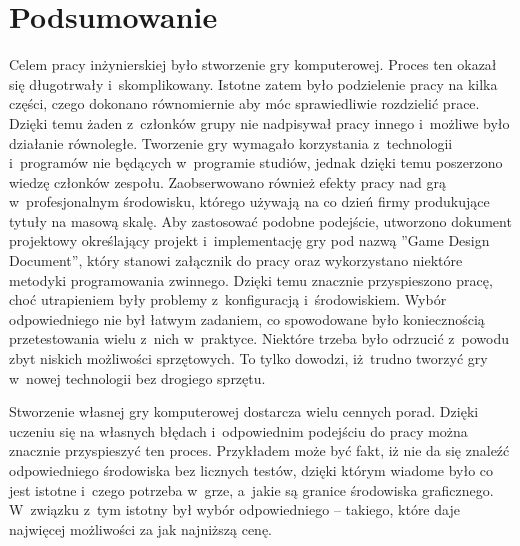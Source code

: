 \chapter{Podsumowanie}

Celem pracy inżynierskiej było stworzenie gry komputerowej. Proces ten okazał się długotrwały i~skomplikowany. Istotne zatem było podzielenie pracy na kilka części, czego dokonano równomiernie aby móc sprawiedliwie rozdzielić prace. Dzięki temu żaden z~członków grupy nie nadpisywał pracy innego i~możliwe było działanie równoległe. Tworzenie gry wymagało korzystania z~technologii i~programów nie będących w~programie studiów, jednak dzięki temu poszerzono wiedzę członków zespołu. Zaobserwowano również efekty pracy nad grą w~profesjonalnym środowisku, którego używają na co dzień firmy produkujące tytuły na masową skalę. Aby zastosować podobne podejście, utworzono dokument projektowy określający projekt i~implementację gry pod nazwą ''Game Design Document'', który stanowi załącznik do pracy oraz wykorzystano niektóre metodyki programowania zwinnego. Dzięki temu znacznie przyspieszono pracę, choć utrapieniem były problemy z~konfiguracją i~środowiskiem. Wybór odpowiedniego nie był łatwym zadaniem, co spowodowane było koniecznością przetestowania wielu z~nich w~praktyce. Niektóre trzeba było odrzucić z~powodu zbyt niskich możliwości sprzętowych. To tylko dowodzi, iż~trudno tworzyć gry w~nowej technologii bez drogiego sprzętu.

Stworzenie własnej gry komputerowej dostarcza wielu cennych porad. Dzięki uczeniu się na własnych błędach i~odpowiednim podejściu do pracy można znacznie przyspieszyć ten proces. Przykładem może być fakt, iż nie da się znaleźć odpowiedniego środowiska bez licznych testów, dzięki którym wiadome było co jest istotne i~czego potrzeba w~grze, a~jakie są granice środowiska graficznego. W~związku z~tym istotny był wybór odpowiedniego -- takiego, które daje najwięcej możliwości za jak najniższą cenę.